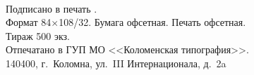 ~
\vfill
\centering
\begin{minipage}{0.8\tw}
    \small
    \centering
    Подписано в печать \signed.\\
    Формат 84$\times$108/32. Бумага офсетная. Печать офсетная.\\
    Тираж 500 экз.\\
    Отпечатано в ГУП МО <<Коломенская типография>>.\\ 140400, г.~Коломна, ул.~III Интернационала, д.~2a
\end{minipage}
\label{pg:last-page}
